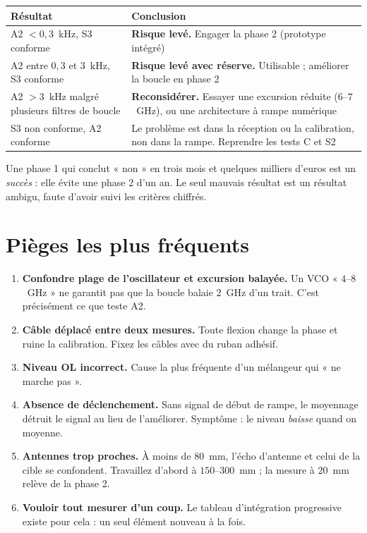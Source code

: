 \begin{table}[H]
\centering
\begin{tabular}{>{\raggedright\arraybackslash}p{5.0cm}%
                >{\raggedright\arraybackslash}p{9.4cm}}
\toprule
Résultat & Conclusion \\
\midrule
A2 $< 0{,}3$~kHz, S3 conforme & \textbf{Risque levé.} Engager la phase 2
  (prototype intégré) \\[1mm]
A2 entre $0{,}3$ et $3$~kHz, S3 conforme & \textbf{Risque levé avec réserve.}
  Utilisable ; améliorer la boucle en phase 2 \\[1mm]
A2 $> 3$~kHz malgré plusieurs filtres de boucle & \textbf{Reconsidérer.}
  Essayer une excursion réduite ($6$--$7$~GHz), ou une architecture à rampe
  numérique \\[1mm]
S3 non conforme, A2 conforme & Le problème est dans la réception ou la
  calibration, non dans la rampe. Reprendre les tests C et S2 \\
\bottomrule
\end{tabular}
\end{table}

\begin{attention}
Une phase 1 qui conclut « non » en trois mois et quelques milliers d'euros est
un \emph{succès} : elle évite une phase 2 d'un an. Le seul mauvais résultat est
un résultat ambigu, faute d'avoir suivi les critères chiffrés.
\end{attention}

\section{Pièges les plus fréquents}

\begin{enumerate}
\item \textbf{Confondre plage de l'oscillateur et excursion balayée.} Un VCO
      « $4$--$8$~GHz » ne garantit pas que la boucle balaie $2$~GHz d'un trait.
      C'est précisément ce que teste A2.
\item \textbf{Câble déplacé entre deux mesures.} Toute flexion change la phase
      et ruine la calibration. Fixez les câbles avec du ruban adhésif.
\item \textbf{Niveau OL incorrect.} Cause la plus fréquente d'un mélangeur qui
      « ne marche pas ».
\item \textbf{Absence de déclenchement.} Sans signal de début de rampe, le
      moyennage détruit le signal au lieu de l'améliorer. Symptôme : le niveau
      \emph{baisse} quand on moyenne.
\item \textbf{Antennes trop proches.} À moins de $80$~mm, l'écho d'antenne et
      celui de la cible se confondent. Travaillez d'abord à $150$--$300$~mm ;
      la mesure à $20$~mm relève de la phase 2.
\item \textbf{Vouloir tout mesurer d'un coup.} Le tableau d'intégration
      progressive existe pour cela : un seul élément nouveau à la fois.
\end{enumerate}
